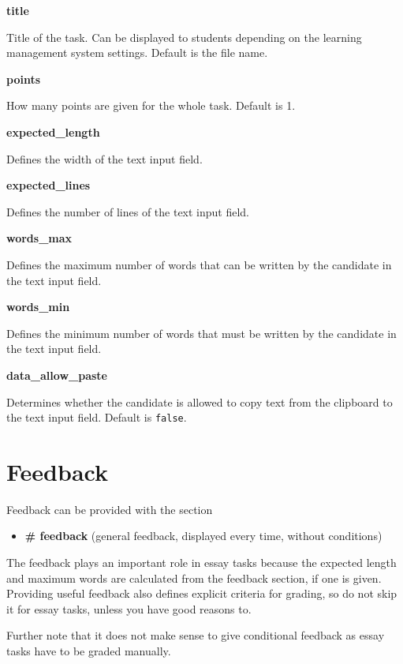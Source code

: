\documentclass[twoside]{tufte-book}
\providecommand{\tightlist}{%
  \setlength{\itemsep}{0pt}\setlength{\parskip}{0pt}}
\begin{document}
\noindent\textbf{title}\label{title-4}

Title of the task. Can be displayed to students depending on the learning management system settings. Default is the file name.

\noindent\textbf{points}\label{points-5}

How many points are given for the whole task. Default is 1.

\noindent\textbf{expected\_length}\label{expected_length-2}

Defines the width of the text input field.

\noindent\textbf{expected\_lines}\label{expected_lines}

Defines the number of lines of the text input field.

\noindent\textbf{words\_max}\label{words_max}

Defines the maximum number of words that can be written by the candidate in the text input field.

\noindent\textbf{words\_min}\label{words_min}

Defines the minimum number of words that must be written by the candidate in the text input field.

\noindent\textbf{data\_allow\_paste}\label{data_allow_paste}

Determines whether the candidate is allowed to copy text from the clipboard to the text input field. Default is \texttt{false}.

\section{Feedback}\label{feedback-4}

Feedback can be provided with the section

\begin{itemize}
\tightlist
\item
  \textbf{\# feedback} (general feedback, displayed every time, without conditions)
\end{itemize}

The feedback plays an important role in essay tasks because the expected length and maximum words are calculated from the feedback section, if one is given. Providing useful feedback also defines explicit criteria for grading, so do not skip it for essay tasks, unless you have good reasons to.

Further note that it does not make sense to give conditional feedback as essay tasks have to be graded manually.
\end{document}
